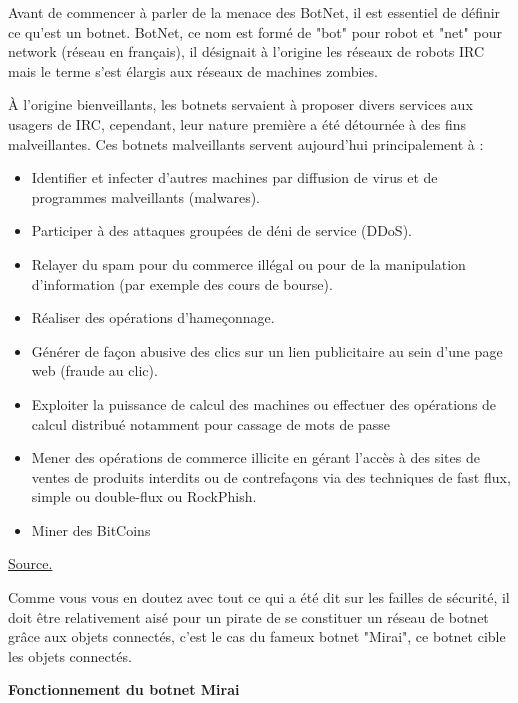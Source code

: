 \documentclass[a4paper]{report}
\begin{document}
	Avant de commencer à parler de la menace des BotNet, il est essentiel de définir ce qu'est un botnet.
	BotNet, ce nom est formé de "bot" pour robot et "net" pour network (réseau en français), il désignait à l'origine les réseaux de robots
	IRC mais le terme s'est élargis aux réseaux de machines zombies.
	
	\bigbreak
	
	À l'origine bienveillants, les botnets servaient à proposer divers services aux usagers de IRC, cependant, leur nature première a été 
	détournée à des fins malveillantes. Ces botnets malveillants servent aujourd'hui principalement à :
	\begin{itemize}
		\item Identifier et infecter d’autres machines par diffusion de virus et de programmes malveillants (malwares).
		\item Participer à des attaques groupées de déni de service (DDoS).
		\item Relayer du spam pour du commerce illégal ou pour de la manipulation d'information (par exemple des cours de bourse).
		\item Réaliser des opérations d'hameçonnage.
		\item Générer de façon abusive des clics sur un lien publicitaire au sein d’une page web (fraude au clic).
		\item Exploiter la puissance de calcul des machines ou effectuer des opérations de calcul distribué notamment pour cassage de mots 
		de passe
		\item Mener des opérations de commerce illicite en gérant l'accès à des sites de ventes de produits interdits ou de contrefaçons 
		via des techniques de fast flux, simple ou double-flux ou RockPhish.
		\item Miner des BitCoins
	\end{itemize}
	\href{https://fr.wikipedia.org/wiki/Botnet#Usages_des_botnets}{Source.}
	\bigbreak
		
	Comme vous vous en doutez avec tout ce qui a été dit sur les failles de sécurité, il doit être relativement aisé pour un pirate
	de se constituer un réseau de botnet grâce aux objets connectés, c'est le cas du fameux botnet "Mirai", ce botnet cible les objets
	connectés.
	
	\bigbreak
	
	\begin{flushleft}
		\textbf{Fonctionnement du botnet Mirai} \\
	\end{flushleft}
	
\end{document}
